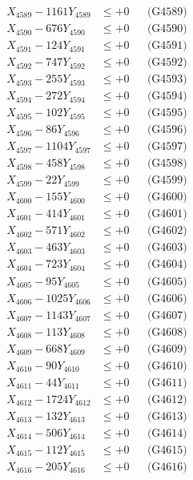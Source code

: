 \documentclass[a4paper,10pt]{article}
\begin{document}
{\begin{align}
X_{4589} - 1161Y_{4589} &\leq +0 && \text{(G4589)} \\
X_{4590} - 676Y_{4590} &\leq +0 && \text{(G4590)} \\
\allowbreak
X_{4591} - 124Y_{4591} &\leq +0 && \text{(G4591)} \\
X_{4592} - 747Y_{4592} &\leq +0 && \text{(G4592)} \\
X_{4593} - 255Y_{4593} &\leq +0 && \text{(G4593)} \\
X_{4594} - 272Y_{4594} &\leq +0 && \text{(G4594)} \\
X_{4595} - 102Y_{4595} &\leq +0 && \text{(G4595)} \\
X_{4596} - 86Y_{4596} &\leq +0 && \text{(G4596)} \\
X_{4597} - 1104Y_{4597} &\leq +0 && \text{(G4597)} \\
X_{4598} - 458Y_{4598} &\leq +0 && \text{(G4598)} \\
X_{4599} - 22Y_{4599} &\leq +0 && \text{(G4599)} \\
X_{4600} - 155Y_{4600} &\leq +0 && \text{(G4600)} \\
\allowbreak
X_{4601} - 414Y_{4601} &\leq +0 && \text{(G4601)} \\
X_{4602} - 571Y_{4602} &\leq +0 && \text{(G4602)} \\
X_{4603} - 463Y_{4603} &\leq +0 && \text{(G4603)} \\
X_{4604} - 723Y_{4604} &\leq +0 && \text{(G4604)} \\
X_{4605} - 95Y_{4605} &\leq +0 && \text{(G4605)} \\
X_{4606} - 1025Y_{4606} &\leq +0 && \text{(G4606)} \\
X_{4607} - 1143Y_{4607} &\leq +0 && \text{(G4607)} \\
X_{4608} - 113Y_{4608} &\leq +0 && \text{(G4608)} \\
X_{4609} - 668Y_{4609} &\leq +0 && \text{(G4609)} \\
X_{4610} - 90Y_{4610} &\leq +0 && \text{(G4610)} \\
\allowbreak
X_{4611} - 44Y_{4611} &\leq +0 && \text{(G4611)} \\
X_{4612} - 1724Y_{4612} &\leq +0 && \text{(G4612)} \\
X_{4613} - 132Y_{4613} &\leq +0 && \text{(G4613)} \\
X_{4614} - 506Y_{4614} &\leq +0 && \text{(G4614)} \\
X_{4615} - 112Y_{4615} &\leq +0 && \text{(G4615)} \\
X_{4616} - 205Y_{4616} &\leq +0 && \text{(G4616)} \\

\end{align}}
\end{document}
